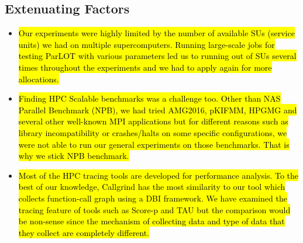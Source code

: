 \subsection{Extenuating Factors}

\begin{itemize}

\item \hl{ Our experiments were highly limited by the number of available SUs (service units) we had on multiple supercomputers. Running large-scale jobs for testing ParLOT with various parameters led us to running out of SUs several times throughout the experiments and we had to apply again for more allocations.}
\item \hl{ Finding HPC Scalable benchmarks was a challenge too. Other than NAS Parallel Benchmark (NPB), we had tried AMG2016, pKIFMM, HPGMG and several other well-known MPI applications but for different reasons such as library incompatibility or crashes/halts on some specific configurations, we were not able to run our general experiments on those benchmarks. That is why we stick NPB benchmark.}
\item \hl{Most of the HPC tracing tools are developed for performance analysis. To the best of our knowledge, Callgrind has the most similarity to our tool which collects function-call graph using a DBI framework. We have examined the tracing feature of tools such as Score-p and TAU but the comparison would be non-sense since the mechanism of collecting data and type of data that they collect are completely different.   
}
\end{itemize} 
